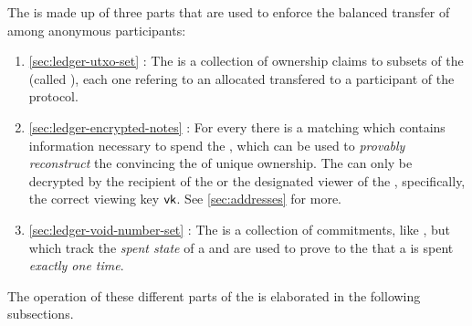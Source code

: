 The \ShieldedAssetPool{} is made up of three parts that are used to enforce the balanced transfer of  among anonymous participants:

\begin{enumerate}
    \item \autoref{sec:ledger-utxo-set} \UTXOSet{}: The \UTXOSet{} is a collection of ownership claims to subsets of the \ShieldedAssetPool{} (called ), each one refering to an allocated \SecretAsset{} transfered to a participant of the protocol.
    \item \autoref{sec:ledger-encrypted-notes} : For every \UTXO{} there is a matching \EncryptedNote{} which contains information necessary to spend the \SecretAsset{}, which can be used to \emph{provably reconstruct} the \UTXO{} convincing the \Ledger{} of unique ownership. The \EncryptedNote{} can only be decrypted by the recipient of the \SecretAsset{} or the designated viewer of the \UTXO{}, specifically, the correct viewing key ${\textsf{vk}}$. See \autoref{sec:addresses} for more.
    \item \autoref{sec:ledger-void-number-set} \VoidNumberSet{}: The \VoidNumberSet{} is a collection of commitments, like , but which track the \emph{spent state} of a \SecretAsset{} and are used to prove to the \Ledger{} that a \SecretAsset{} is spent \emph{exactly one time}. 
\end{enumerate}

The operation of these different parts of the \ShieldedAssetPool{} is elaborated in the following subsections.



